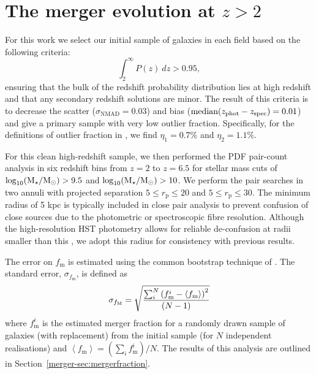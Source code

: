\section{The merger evolution at $z > 2$}\label{merger-sec:results}
 
For this work we select our initial sample of galaxies in each field based on the following criteria:
\begin{equation}
	\int_{2}^{\infty} P(z)~dz > 0.95, 
\end{equation}
ensuring that the bulk of the redshift probability distribution lies at high redshift and that any secondary redshift solutions are minor. The result of this criteria is to decrease the scatter ($\sigma_{\text{NMAD}} = 0.03$) and bias ($\text{median}(z_{\rm{phot}} - z_{\rm{spec}}) = 0.01$) and give a primary sample with very low outlier fraction. Specifically, for the definitions of outlier fraction in \citet{Molino:2014iz}, we find $\eta_{1} = 0.7\%$ and $\eta_{2} = 1.1\%$.

For this clean high-redshift sample, we then performed the PDF pair-count analysis in six redshift bins from $z = 2$ to $z = 6.5$ for stellar mass cuts of $\log_{10}(\text{M}_{\star} / \text{M}_{\odot}) > 9.5$ and $\log_{10}(\text{M}_{\star} / \text{M}_{\odot}) > 10$. We perform the pair searches in two annuli with projected separation $5 \leq r_{\text{p}} \leq 20$ and $5 \leq r_{\text{p}} \leq 30$. The minimum radius of 5 kpc is typically included in close pair analysis to prevent confusion of close sources due to the photometric or spectroscopic fibre resolution. Although the high-resolution HST photometry allows for reliable de-confusion at radii smaller than this \citep{Laidler:2007iy,Galametz:2013dd}, we adopt this radius for consistency with previous results.

The error on $f_\text{m}$ is estimated using the common bootstrap technique of \citet{Efron:1979uf,EFRON:HJ2mD4hg}. The standard error, $\sigma_{f_{\text{m}}}$, is defined as
\begin{equation}\label{eq:bootstrap_err}
	\sigma_{f_{\rm{M}}} = 
	\sqrt{\frac{\sum_{i}^{N} \left (f_{\text{m}}^{i} - \left \langle f_{\text{m}}  \right \rangle \right)^{2}}
	{(N-1)}
	} 
\end{equation}
where $f_{\text{m}}^{i}$ is the estimated merger fraction for a randomly drawn sample of galaxies (with replacement) from the initial sample (for $N$ independent realisations) and $\left \langle f_{\text{m}} \right \rangle =  \left( \sum_{i} f_{\text{m}}^{i} \right) / N $. The results of this analysis are outlined in Section~\ref{merger-sec:mergerfraction}.

